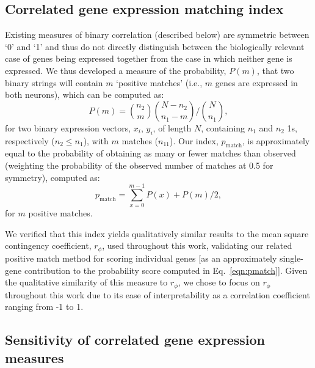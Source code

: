 \documentclass[10pt,letterpaper]{article}
\begin{document}
{\subsection*{Correlated gene expression matching index}
Existing measures of binary correlation (described below) are symmetric between `0' and `1' and thus do not directly distinguish between the biologically relevant case of genes being expressed together from the case in which neither gene is expressed.
We thus developed a measure of the probability, $P(m)$, that two binary strings will contain $m$ `positive matches' (i.e., $m$ genes are expressed in both neurons), which can be computed as:
\begin{equation} \label{eqn:positiveMatch}
    P(m) = \binom{n_2}{m} \binom{N-n_2}{n_1-m} / \binom{N}{n_1},
\end{equation}
for two binary expression vectors, $x_i$, $y_i$, of length $N$, containing $n_1$ and $n_2$ 1s, respectively ($n_2 \leq n_1$), with $m$ matches ($n_{11}$).
Our index, $p_\mathrm{match}$, is approximately equal to the probability of obtaining as many or fewer matches than observed (weighting the probability of the observed number of matches at 0.5 for symmetry), computed as:
\begin{equation} \label{eqn:pmatch}
     p_\mathrm{match} = \sum_{x=0}^{m-1} P(x) + P(m)/2,
\end{equation}
for $m$ positive matches.

We verified that this index yields qualitatively similar results to the mean square contingency coefficient, $r_\phi$, used throughout this work, validating our related positive match method for scoring individual genes [as an approximately single-gene contribution to the probability score computed in Eq.~\eqref{eqn:pmatch}].
Given the qualitative similarity of this measure to $r_\phi$, we chose to focus on $r_\phi$ throughout this work due to its ease of interpretability as a correlation coefficient ranging from -1 to 1.

\subsection*{Sensitivity of correlated gene expression measures}

}
\end{document}
